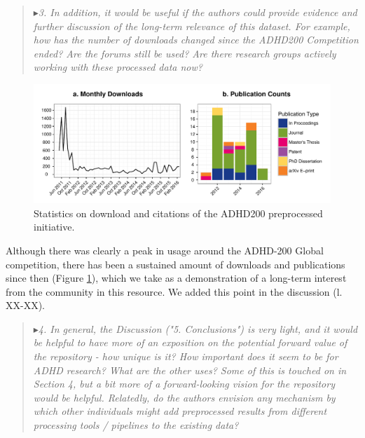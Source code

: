 \documentclass[authoryear,3p]{elsarticle}
\begin{document}
\begin{quote}
$\blacktriangleright$\emph{3. In addition, it would be useful if the authors could provide evidence and further discussion of the long-term relevance of this dataset. For example, how has the number of downloads changed since the ADHD200 Competition ended?  Are the forums still be used?  Are there research groups actively working with these processed data now?}
\end{quote}
\begin{figure}[!t]
\begin{center}
  \includegraphics[width=\linewidth]{impact_stats}
  \caption{Statistics on download and citations of the ADHD200 preprocessed initiative.}
  \label{fig:usage}
\end{center}
\end{figure}

Although there was clearly a peak in usage around the ADHD-200 Global competition, there has been a sustained amount of downloads and publications since then (Figure \ref{fig:usage}), which we take as a demonstration of a long-term interest from the community in this resource.  We added this point in the discussion (l. XX-XX).


\begin{quote}
$\blacktriangleright$\emph{4. In general, the Discussion ("5. Conclusions") is very light, and it would be helpful to have more of an exposition on the potential forward value of the repository - how unique is it?  How important does it seem to be for ADHD research?  What are the other uses?  Some of this is touched on in Section 4, but a bit more of a forward-looking vision for the repository would be helpful.  Relatedly, do the authors envision any mechanism by which other individuals might add preprocessed results from different processing tools / pipelines to the existing data?
}
\end{quote}
\end{document}
